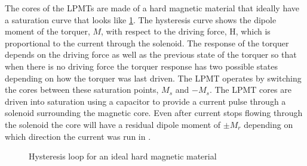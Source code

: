 The cores of the \acp{LPMT} are made of a hard magnetic material that ideally have a saturation curve that looks like \cref{fig:histlpmt}. The hysteresis curve shows the dipole moment of the torquer, $M$, with respect to the driving force, H, which is proportional to the current through the solenoid. The response of the torquer depends on the driving force as well as the previous state of the torquer so that when there is no driving force the torquer response has two possible states depending on how the torquer was last driven. The \ac{LPMT} operates by switching the cores between these saturation points, $M_s$ and $-M_s$. The \ac{LPMT} cores are driven into saturation using a capacitor to provide a current pulse through a solenoid surrounding the magnetic core. Even after current stops flowing through the solenoid the core will have a residual dipole moment of $\pm M_r$ depending on which direction the current was run in \cite{Mentch11}.

\begin{figure}[H]
    \centering
    \caption{Hysteresis loop for an ideal hard magnetic material}
    \label{fig:histlpmt}
\end{figure}

